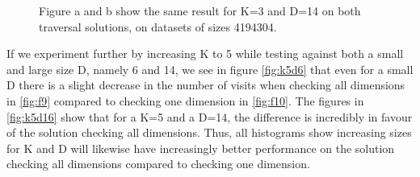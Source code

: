 \begin{figure}[H]
  \centering
  \caption{Figure a and b show the same result for K=3 and D=14 on both traversal solutions, on datasets of sizes 4194304.}
  \label{fig:k3d16}
\end{figure}


If we experiment further by increasing K to 5 while testing against both a small and large size D, namely 6 and 14, we see in figure \ref{fig:k5d6} that even for a small D there is a slight decrease in the number of visits when checking all dimensions in \ref{fig:f9} compared to checking one dimension in \ref{fig:f10}. The figures in \ref{fig:k5d16} show that for a K=5 and a D=14, the difference is incredibly in favour of the solution checking all dimensions. Thus, all histograms show increasing sizes for K and D will likewise have increasingly better performance on the solution checking all dimensions compared to checking one dimension. 

